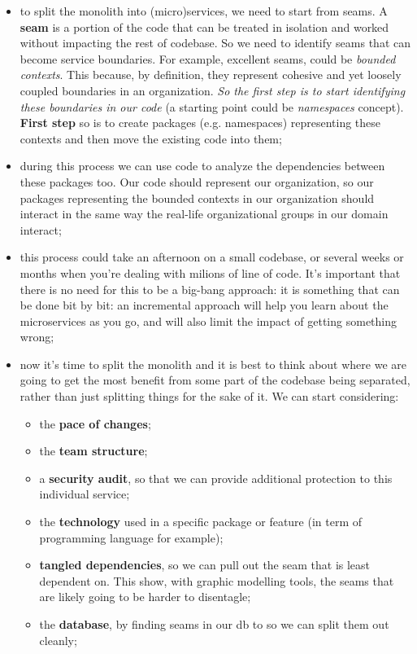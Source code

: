 \documentclass[oneside]{article}
\begin{document}
\begin{itemize}
    \item to split the monolith into (micro)services, we need to start from seams. A \textbf{seam} is a portion of the code that can be treated in isolation and worked without impacting the rest of codebase. So we need to identify seams that can become service boundaries.
    \newline
    For example, excellent seams, could be \textit{bounded contexts}. This because, by definition, they represent cohesive and yet loosely coupled boundaries in an organization. \textit{So the first step is to start identifying these boundaries in our code} (a starting point could be \textit{namespaces} concept).
    \newline
    \textbf{First step} so is to create packages (e.g. namespaces) representing these contexts and then move the existing code into them;
    
    \item during this process we can use code to analyze the dependencies between these packages too. Our code should represent our organization, so our packages representing the bounded contexts in our organization should interact in the same way the real-life organizational groups in our domain interact;
    
    \item this process could take an afternoon on a small codebase, or several weeks or months when you're dealing with milions of line of code. It's important that there is no need for this to be a big-bang approach: it is something that can be done bit by bit: an incremental approach will help you learn about the microservices as you go, and will also limit the impact of getting something wrong;
    
    \item now it's time to split the monolith and it is best to think about where we are going to get the most benefit from some part of the codebase being separated, rather than just splitting things for the sake of it. We can start considering:
        \begin{itemize}
            \item the \textbf{pace of changes};
            \item the \textbf{team structure};
            \item a \textbf{security audit}, so that we can provide additional protection to this individual service;
            \item the \textbf{technology} used in a specific package or feature (in term of programming language for example);
            \item \textbf{tangled dependencies}, so we can pull out the seam that is least dependent on. This show, with graphic modelling tools, the seams that are likely going to be harder to disentagle;
            \item the \textbf{database}, by finding seams in our db to so we can split them out cleanly;
        \end{itemize}
    

\end{itemize}
\end{document}
